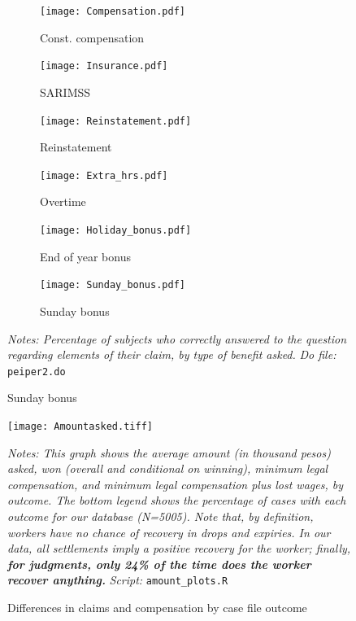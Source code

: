 \documentclass[11pt]{article}
\begin{document}
\begin{figure}[H]
    \caption{Knowledge about their own claims in lawsuit}
    \label{Knowtheirclaimsfig}
    \begin{center}
        \begin{subfigure}{0.49\textwidth}
            \caption{Const. compensation}
            \centering
            \texttt{[image: Compensation.pdf]}
        \end{subfigure}
        \begin{subfigure}{0.49\textwidth}
            \caption{SARIMSS}
                \centering
                \texttt{[image: Insurance.pdf]}
        \end{subfigure}
        \begin{subfigure}{0.49\textwidth}
            \caption{Reinstatement}
            \centering
            \texttt{[image: Reinstatement.pdf]}
        \end{subfigure}
            \hfill
        \begin{subfigure}{0.49\textwidth}
            \caption{Overtime}
            \centering
            \texttt{[image: Extra\_hrs.pdf]}
        \end{subfigure}
        \begin{subfigure}{0.49\textwidth}
            \caption{End of year bonus}
            \centering
            \texttt{[image: Holiday\_bonus.pdf]}
        \end{subfigure}
            \hfill
        \begin{subfigure}{0.49\textwidth}
            \caption{Sunday bonus}
            \centering
            \texttt{[image: Sunday\_bonus.pdf]}
        \end{subfigure}
    \end{center} 
        \footnotesize \textit{Notes: Percentage of subjects who correctly answered to the question regarding elements of their claim, by type of benefit asked.}
        {\footnotesize \textit{Do file: }  \texttt{peiper2.do}}
\end{figure}

 
    
\begin{figure}[H]
    \caption{Differences in claims and compensation by case file outcome}
    \label{claimsvsoutcomes}
    \begin{center}
        \texttt{[image: Amountasked.tiff]}
        \end{center}
    \footnotesize \textit{Notes: This graph shows the average amount (in thousand pesos) asked, won (overall and conditional on winning), minimum legal compensation, and minimum legal compensation plus lost wages, by outcome. The bottom legend shows the percentage of cases with each outcome for our database (N=5005). Note that, by definition, workers have no chance of recovery in drops and expiries. In our data, all settlements imply a positive recovery for the worker; finally, \textbf{for judgments, only 24\% of the time does the worker recover anything.}} 
    {\footnotesize \textit{Script: } \texttt{amount\_plots.R}}
\end{figure}
\end{document}
